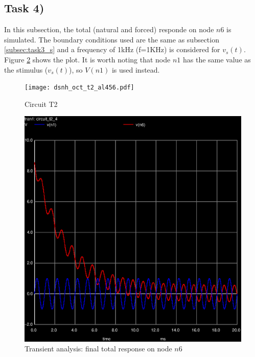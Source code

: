 \subsection{Task 4)}
\label{subsec:task4_s}

In this subsection, the total (natural and forced) responde on node $n6$ is simulated. The boundary
conditions used are the same as subsection \ref{subsec:task3_s} and a frequency of 1kHz (f=1KHz) is
considered for $v_s(t)$. Figure \ref{fig:trans-2} shows the plot. It is worth noting that node $n1$ has
the same value as the stimulus ($v_s(t)$), so $V(n1)$ is used instead.

\begin{figure}[H]
	\centering
	\texttt{[image: dsnh\_oct\_t2\_al456.pdf]}
	\caption{Circuit T2}
\label{circ_ori}
\end{figure}

\begin{figure}[H]
	\centering
	\includegraphics[width=0.7\linewidth]{trans-2.eps}
	\caption{Transient analysis: final total response on node $n6$}
\label{fig:trans-2}
\end{figure}



